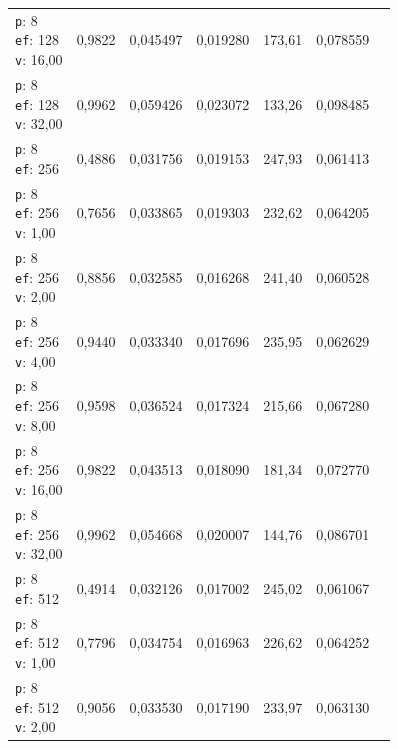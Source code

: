 \begin{table}[htbp]
\begin{tabularx}{\textwidth}{Xrrrrrr}
    \makecell{\texttt{p}: 8\\\texttt{ef}: 128\\\texttt{v}: 16,00} & 0,9822 & 0,045497 & 0,019280 & 173,61 & 0,078559 \\
    \makecell{\texttt{p}: 8\\\texttt{ef}: 128\\\texttt{v}: 32,00} & 0,9962 & 0,059426 & 0,023072 & 133,26 & 0,098485 \\
    \makecell{\texttt{p}: 8\\\texttt{ef}: 256} & 0,4886 & 0,031756 & 0,019153 & 247,93 & 0,061413 \\
    \makecell{\texttt{p}: 8\\\texttt{ef}: 256\\\texttt{v}: 1,00} & 0,7656 & 0,033865 & 0,019303 & 232,62 & 0,064205 \\
    \makecell{\texttt{p}: 8\\\texttt{ef}: 256\\\texttt{v}: 2,00} & 0,8856 & 0,032585 & 0,016268 & 241,40 & 0,060528 \\
    \makecell{\texttt{p}: 8\\\texttt{ef}: 256\\\texttt{v}: 4,00} & 0,9440 & 0,033340 & 0,017696 & 235,95 & 0,062629 \\
    \makecell{\texttt{p}: 8\\\texttt{ef}: 256\\\texttt{v}: 8,00} & 0,9598 & 0,036524 & 0,017324 & 215,66 & 0,067280 \\
    \makecell{\texttt{p}: 8\\\texttt{ef}: 256\\\texttt{v}: 16,00} & 0,9822 & 0,043513 & 0,018090 & 181,34 & 0,072770 \\
    \makecell{\texttt{p}: 8\\\texttt{ef}: 256\\\texttt{v}: 32,00} & 0,9962 & 0,054668 & 0,020007 & 144,76 & 0,086701 \\
    \makecell{\texttt{p}: 8\\\texttt{ef}: 512} & 0,4914 & 0,032126 & 0,017002 & 245,02 & 0,061067 \\
    \makecell{\texttt{p}: 8\\\texttt{ef}: 512\\\texttt{v}: 1,00} & 0,7796 & 0,034754 & 0,016963 & 226,62 & 0,064252 \\
    \makecell{\texttt{p}: 8\\\texttt{ef}: 512\\\texttt{v}: 2,00} & 0,9056 & 0,033530 & 0,017190 & 233,97 & 0,063130 \\

\end{tabularx}
\end{table}
